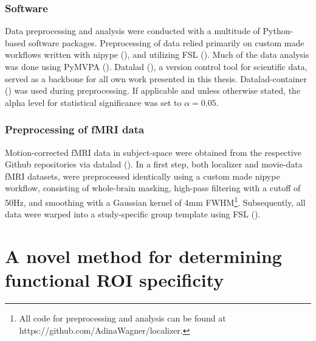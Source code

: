 \documentclass[a4paper, 12pt]{scrreprt}
\begin{document}
\subsection{Software}
Data preprocessing and analysis were conducted with a multitude of Python-based software packages. Preprocessing of data relied primarily on custom made workflows written with nipype (\cite{gorgolewski_krzysztof}), and utilizing FSL (\cite{jenkinson2012fsl}). Much of the data analysis was done using PyMVPA (\cite{hanke2009pymvpa}). Datalad (\cite{visconti_di_oleggio_castello_matteo_2019_2560733}), a version control tool for scientific data, served as a backbone for all own work presented in this thesis. Datalad-container (\cite{michael_hanke_2018_2431915}) was used during preprocessing. If applicable and unless otherwise stated, the alpha level for statistical significance was set to $\alpha = 0.05$.

\subsection{Preprocessing of fMRI data}

Motion-corrected fMRI data in subject-space were obtained from the respective Github repositories via datalad (\cite{visconti_di_oleggio_castello_matteo_2019_2560733}). In a first step, both localizer and movie-data fMRI datasets, were preprocessed identically using a custom made nipype workflow, consisting of whole-brain masking, high-pass filtering with a cutoff of 50Hz, and smoothing with a Gaussian kernel of 4mm FWHM\footnote{All code for preprocessing and analysis can be found at https://github.com/AdinaWagner/localizer.}. Subsequently, all data were warped into a study-specific group template using FSL (\cite{jenkinson2012fsl}). 


\chapter{A novel method for determining functional ROI specificity}\label{c1}
\end{document}
